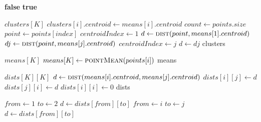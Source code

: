 \documentclass[a4paper, 12pt]{article}
\begin{document}
\begin{algorithm}[H]
\begin{algorithmic}[1]
\State \Return \textbf{false}
\EndIf
\EndFor
\State \Return \textbf{true}
\EndFunction
\end{algorithmic}
\end{algorithm}
\begin{algorithm}[H]
\begin{algorithmic}[1]
\State \(clusters[K]\)
\State \(clusters[i].centroid \gets means[i].centroid\)
\EndFor
\State \(count \gets points.size\)
\State \(point \gets points[index]\)
\State \(centroidIndex \gets 1\)
\State \(d \gets \Call{dist}{point, means[1].centroid}\)
\State \(dj \gets \Call{dist}{point, means[j].centroid}\)
    \State \(centroidIndex \gets j\)
    \State \(d \gets dj\)
\EndIf
\EndFor
\State {}
\EndFor
\State \Return clusters
\EndFunction
\end{algorithmic}
\end{algorithm}
\begin{algorithm}[H]
\begin{algorithmic}[1]
\State \(means[K]\)
\State \(means[K] \gets \Call{pointMean}{points[i]}\)
\EndFor
\State \Return means
\EndFunction
\end{algorithmic}
\end{algorithm}
\begin{algorithm}[H]
\begin{algorithmic}[1]
\State \(dists[K][K]\)
\State \(d \gets \Call{dist}{means[i].centroid, means[j].centroid}\)
\State \(dists[i][j] \gets d\)
\State \(dists[j][i] \gets d\)
\EndFor
\State \(dists[i][i] \gets 0\)
\EndFor
\State \Return dists
\EndFunction
\end{algorithmic}
\end{algorithm}
\begin{algorithm}[H]
\begin{algorithmic}[1]
\State \(from \gets 1\)
\State \(to \gets 2\)
\State \(d \gets dists[from][to]\)
\State \(from \gets i\)
\State \(to \gets j\)
\State \(d \gets dists[from][to]\)
\EndIf
\EndFor
\EndFor
\State \Return \(<from, to, d>\)
\EndFunction
\end{algorithmic}
\end{algorithm}
\end{document}
